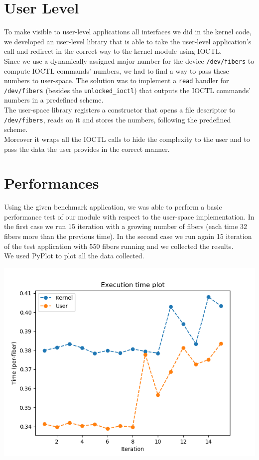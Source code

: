 \documentclass[a4paper]{article}
\begin{document}
\section{User Level}
To make visible to user-level applications all interfaces we did in the kernel code, we developed an user-level library that is able to take the user-level application's call and redirect in the correct way to the kernel module using IOCTL.\bigskip\\
Since we use a dynamically assigned major number for the device \texttt{/dev/fibers} to compute IOCTL commands' numbers, we had to find a way to pass these numbers to user-space.
The solution was to implement a \texttt{read} handler for \texttt{/dev/fibers} (besides the \texttt{unlocked\_ioctl}) that outputs the IOCTL commands' numbers in a predefined scheme.\bigskip\\
The user-space library registers a constructor that opens a file descriptor to \texttt{/dev/fibers}, reads on it and stores the numbers, following the predefined scheme.\bigskip\\
Moreover it wraps all the IOCTL calls to hide the complexity to the user and to pass the data the user provides in the correct manner.

\section{Performances}
Using the given benchmark application, we was able to perform a basic performance test of our module with respect to the user-space implementation.
In the first case we run 15 iteration with a growing number of fibers (each time 32 fibers more than the previous time).
In the second case we run again 15 iteration of the test application with 550 fibers running and we collected the results.\\We used PyPlot to plot all the data collected.

\begin{center}
\includegraphics[scale=0.65]{../perf/user-kernel}\bigskip\\
\end{center}
\end{document}
